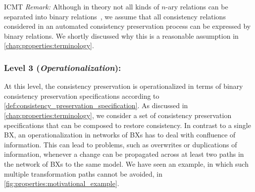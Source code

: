 \begin{copiedFrom}{ICMT}
\noindent\textit{Remark:} 
Although in theory not all kinds of $n$-ary relations can be separated into binary relations~\cite{stevens2017a}, we assume that all consistency relations considered in an automated consistency preservation process can be expressed by binary relations.
We shortly discussed why this is a reasonable assumption in \autoref{chap:properties:terminology}.

\subsubsection*{Level 3 (\emph{Operationalization}):}
At this level, the consistency preservation is operationalized in terms of binary consistency preservation specifications according to \autoref{def:consistency_preservation_specification}. %
As discussed in \autoref{chap:properties:terminology}, we consider a set of consistency preservation specifications that can be composed to restore consistency.
In contrast to a single \ac{BX}, an operationalization in %
networks of \acp{BX} has to deal with confluence of information.
This can lead to problems, such as overwrites or duplications of information, whenever a change can be propagated across at least two paths in the network of \acp{BX} to the same model.
We have seen an example, in which such multiple transformation paths cannot be avoided, in \autoref{fig:properties:motivational_example}.


\end{copiedFrom}
